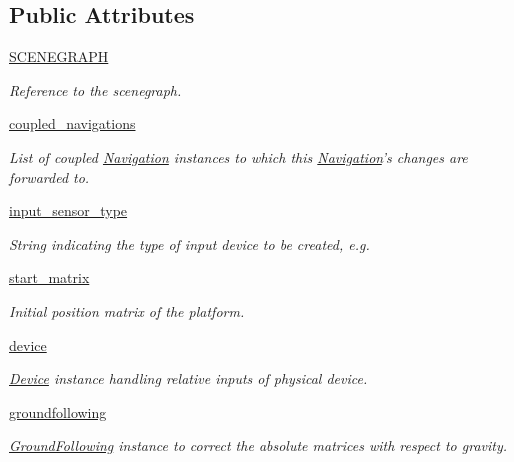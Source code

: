 \subsection*{\-Public \-Attributes}
\begin{DoxyCompactItemize}
\item 
\hyperlink{classlib_1_1Navigation_1_1Navigation_a570f08be79fd7828531009a4c8697ea2}{\-S\-C\-E\-N\-E\-G\-R\-A\-P\-H}
\begin{DoxyCompactList}\small\item\em \-Reference to the scenegraph. \end{DoxyCompactList}\item 
\hyperlink{classlib_1_1Navigation_1_1Navigation_aef564d64ca927ab79ea482745bc47ced}{coupled\-\_\-navigations}
\begin{DoxyCompactList}\small\item\em \-List of coupled \hyperlink{classlib_1_1Navigation_1_1Navigation}{\-Navigation} instances to which this \hyperlink{classlib_1_1Navigation_1_1Navigation}{\-Navigation}'s changes are forwarded to. \end{DoxyCompactList}\item 
\hyperlink{classlib_1_1Navigation_1_1Navigation_ae079b6aaf8ce61ce5648dbe9824c7865}{input\-\_\-sensor\-\_\-type}
\begin{DoxyCompactList}\small\item\em \-String indicating the type of input device to be created, e.\-g. \end{DoxyCompactList}\item 
\hyperlink{classlib_1_1Navigation_1_1Navigation_aec6160651da60e489723179c8f243867}{start\-\_\-matrix}
\begin{DoxyCompactList}\small\item\em \-Initial position matrix of the platform. \end{DoxyCompactList}\item 
\hyperlink{classlib_1_1Navigation_1_1Navigation_a479f92284f2843ba032ad5996b096f4a}{device}
\begin{DoxyCompactList}\small\item\em \hyperlink{namespacelib_1_1Device}{\-Device} instance handling relative inputs of physical device. \end{DoxyCompactList}\item 
\hyperlink{classlib_1_1Navigation_1_1Navigation_ae205315b78f246befc2c842f618c76be}{groundfollowing}
\begin{DoxyCompactList}\small\item\em \hyperlink{namespacelib_1_1GroundFollowing}{\-Ground\-Following} instance to correct the absolute matrices with respect to gravity. \end{DoxyCompactList}\item 

\end{DoxyCompactItemize}

